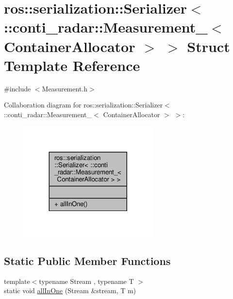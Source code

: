 \hypertarget{structros_1_1serialization_1_1Serializer_3_01_1_1conti__radar_1_1Measurement___3_01ContainerAllocator_01_4_01_4}{}\section{ros\+:\+:serialization\+:\+:Serializer$<$ \+:\+:conti\+\_\+radar\+:\+:Measurement\+\_\+$<$ Container\+Allocator $>$ $>$ Struct Template Reference}
\label{structros_1_1serialization_1_1Serializer_3_01_1_1conti__radar_1_1Measurement___3_01ContainerAllocator_01_4_01_4}


{\ttfamily \#include $<$Measurement.\+h$>$}



Collaboration diagram for ros\+:\+:serialization\+:\+:Serializer$<$ \+:\+:conti\+\_\+radar\+:\+:Measurement\+\_\+$<$ Container\+Allocator $>$ $>$\+:\nopagebreak
\begin{figure}[H]
\begin{center}
\leavevmode
\includegraphics[width=200pt]{dc/dfe/structros_1_1serialization_1_1Serializer_3_01_1_1conti__radar_1_1Measurement___3_01ContainerAllocator_01_4_01_4__coll__graph}
\end{center}
\end{figure}
\subsection*{Static Public Member Functions}
\begin{DoxyCompactItemize}
\item 
{\footnotesize template$<$typename Stream , typename T $>$ }\\static void \hyperlink{structros_1_1serialization_1_1Serializer_3_01_1_1conti__radar_1_1Measurement___3_01ContainerAllocator_01_4_01_4_af7d04f145cd734b738dcaf33c20ace99}{all\+In\+One} (Stream \&stream, T m)
\end{DoxyCompactItemize}


